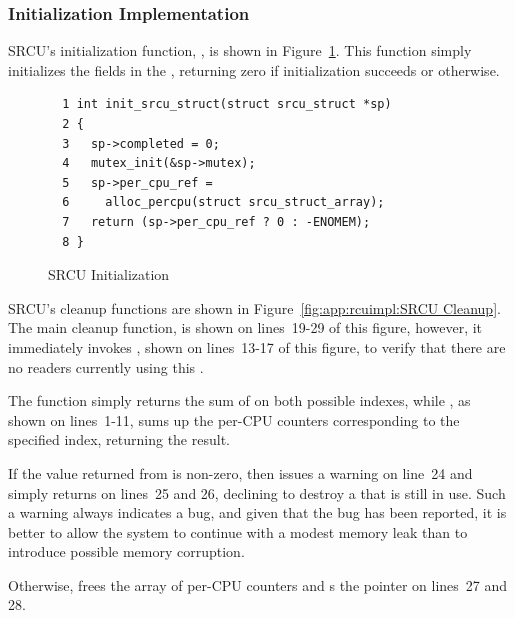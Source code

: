 \subsubsection{Initialization Implementation}
\label{sec:app:rcuimpl:Initialization Implementation}

SRCU's initialization function, , is shown in
Figure~\ref{fig:app:rcuimpl:SRCU Initialization}.
This function simply initializes the fields in the
 , returning zero if initialization succeeds
or  otherwise.

\begin{figure}[htbp]
{ \scriptsize
\begin{verbatim}
  1 int init_srcu_struct(struct srcu_struct *sp)
  2 {
  3   sp->completed = 0;
  4   mutex_init(&sp->mutex);
  5   sp->per_cpu_ref =
  6     alloc_percpu(struct srcu_struct_array);
  7   return (sp->per_cpu_ref ? 0 : -ENOMEM);
  8 }
\end{verbatim}
}
\caption{SRCU Initialization}
\label{fig:app:rcuimpl:SRCU Initialization}
\end{figure}

SRCU's cleanup functions are shown in
Figure~\ref{fig:app:rcuimpl:SRCU Cleanup}.
The main cleanup function,  is shown
on lines~19-29 of this figure, however, it immediately invokes
, shown on lines~13-17 of this figure,
to verify that there are no readers currently using this
 .

The  function simply returns the sum of
 on both possible indexes,
while , as shown on lines~1-11,
sums up the per-CPU counters corresponding to the specified index,
returning the result.

If the value returned from  is non-zero,
then  issues a warning on line~24 and
simply returns on lines~25 and 26, declining to destroy a
  that is still in use.
Such a warning always indicates a bug, and given that the bug
has been reported, it is better to allow the system to continue
with a modest memory leak than to introduce possible memory corruption.

Otherwise,  frees the array of per-CPU
counters and s the pointer on lines~27 and 28.

